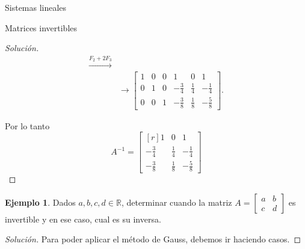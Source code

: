 \documentclass[a4paper,12pt,twoside,spanish,reqno]{amsbook}
\theoremstyle{definition}
\newtheorem{ejemplo}{Ejemplo}[section]
\theoremstyle{remark}
\begin{document}
\begin{chapter}{Sistemas lineales}
\begin{section}{Matrices invertibles}
\begin{proof}[Solución]
\begin{align*}
                \stackrel{F_2+2F_3}{\longrightarrow} \\
                &\longrightarrow
                \left[\begin{array}{rrr|rrr}	1&0&0&1&0&1\\ 0&1&0&-\frac34&\frac14&-\frac14 \\ 0&0&1&-\frac38&\frac18&-\frac58 \end{array}\right].
                \end{align*}
                
                Por lo tanto 
                \begin{equation*}
                A^{-1} = 	\begin{bmatrix*}[r]	1&0&1\\ -\frac34&\frac14&-\frac14 \\ -\frac38&\frac18&-\frac58 \end{bmatrix*}
                \end{equation*}
            \end{proof}
            
            \begin{ejemplo}\label{inv-2x2-0}
                Dados $a,b,c,d \in \mathbb R$, determinar cuando la matriz $A = \begin{bmatrix*} a&b\\c&d\end{bmatrix*}$  es invertible y en ese caso,  cual es su inversa. 
            \end{ejemplo}
            \begin{proof}[Solución] Para poder aplicar el método de Gauss, debemos ir haciendo casos. 
                

\end{proof}
\end{section}
\end{chapter}
\end{document}
